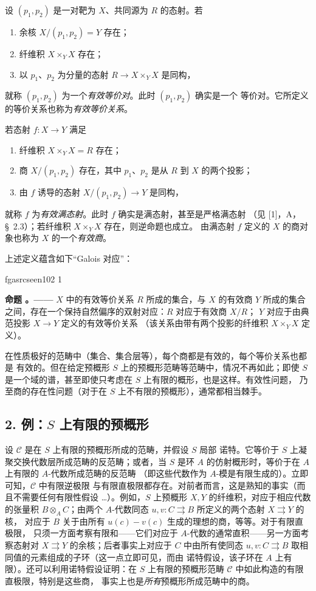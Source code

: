 \documentclass[12pt,twoside,openany]{book}
\numberwithin{equation}{section}
\newcommand{\fgaunitid}{unbound}
\newcommand{\src}[1]{%
  \phantomsection
  \hypertarget{src:\fgaunitid:#1}{}%
  \hypertarget{fga.\fgaunitid.p#1}{}%
  \ifcsname fgasrcseen#1\endcsname\else
    \expandafter\gdef\csname fgasrcseen#1\endcsname{1}%
    \hypertarget{src:#1}{}%
  \fi
  \marginpar{\raggedleft\footnotesize\sffamily #1}%
}
\theoremstyle{plain}
\theoremstyle{definition}
\theoremstyle{remark}
\newcommand{\result}[2]{%
  \par\medskip\noindent\textbf{#1%
  \if\relax\detokenize{#2}\relax\else\space#2\fi。——}\enspace
}
\begin{document}
设 $(p_1,p_2)$ 是一对靶为 $X$、共同源为 $R$ 的态射。若
\begin{enumerate}
  \item[(i)] 余核 $X/(p_1,p_2)=Y$ 存在；
  \item[(ii)] 纤维积 $X\times_Y X$ 存在；
  \item[(iii)] 以 $p_1$、$p_2$ 为分量的态射
  $R\longrightarrow X\times_Y X$ 是同构，
\end{enumerate}
就称 $(p_1,p_2)$ 为一个\emph{有效等价对}。此时 $(p_1,p_2)$ 确实是一个
等价对。它所定义的等价关系也称为\emph{有效等价关系}。

若态射 $f:X\longrightarrow Y$ 满足
\begin{enumerate}
  \item[(i)] 纤维积 $X\times_Y X=R$ 存在；
  \item[(ii)] 商 $X/(p_1,p_2)$ 存在，其中 $p_1$、$p_2$ 是从 $R$ 到 $X$
  的两个投影；
  \item[(iii)] 由 $f$ 诱导的态射
  $X/(p_1,p_2)\longrightarrow Y$ 是同构，
\end{enumerate}
就称 $f$ 为\emph{有效满态射}。此时 $f$ 确实是满态射，甚至是严格满态射
（见 [1]，A，\S~2.3）；若纤维积 $X\times_Y X$ 存在，则逆命题也成立。
由满态射 $f$ 定义的 $X$ 的商对象也称为 $X$ 的一个\emph{有效商}。

上述定义蕴含如下“Galois 对应”：

\src{102}
\result{命题}{1.1} $X$ 中的有效等价关系 $R$ 所成的集合，与 $X$ 的有效商 $Y$
所成的集合之间，存在一个保持自然偏序的双射对应：$R$ 对应于有效商 $X/R$；
$Y$ 对应于由典范投影 $X\longrightarrow Y$ 定义的有效等价关系
（该关系由带有两个投影的纤维积 $X\times_Y X$ 定义）。

在性质极好的范畴中（集合、集合层等），每个商都是有效的，每个等价关系也都是
有效的。但在给定预概形 $S$ 上的预概形范畴等范畴中，情况不再如此；即使 $S$
是一个域的谱，甚至即使只考虑在 $S$ 上有限的概形，也是这样。有效性问题，
乃至商的存在性问题（对于在 $S$ 上不有限的预概形），通常都相当棘手。

\subsection*{2. 例：$S$ 上有限的预概形}

设 $\mathcal C$ 是在 $S$ 上有限的预概形所成的范畴，并假设 $S$ 局部
诺特。它等价于 $S$ 上凝聚交换代数层所成范畴的反范畴；或者，当 $S$ 是环
$A$ 的仿射概形时，等价于在 $A$ 上有限的 $A$-代数所成范畴的反范畴
（即这些代数作为 $A$-模是有限生成的）。立即可知，$\mathcal C$ 中有限逆极限
与有限直极限都存在。对前者而言，这是熟知的事实（而且不需要任何有限性假设
\ldots）。例如，$S$ 上预概形 $X,Y$ 的纤维积，对应于相应代数的张量积
$B\otimes_A C$；由两个 $A$-代数同态
$u,v:C\rightrightarrows B$ 所定义的两个态射 $X\rightrightarrows Y$ 的核，
对应于 $B$ 关于由所有 $u(c)-v(c)$ 生成的理想的商，等等。对于有限直极限，
只须一方面考察有限和——它们对应于 $A$-代数的通常直积——另一方面考察态射对
$X\rightrightarrows Y$ 的余核；后者事实上对应于 $C$ 中由所有使同态
$u,v:C\rightrightarrows B$ 取相同值的元素组成的子环（这一点立即可见，而由
诺特假设，该子环在 $A$ 上有限）。还可以利用诺特假设证明：在
$S$ 上有限的预概形范畴 $\mathcal C$ 中如此构造的有限直极限，特别是这些商，
事实上也是\emph{所有}预概形所成范畴中的商。
\end{document}
